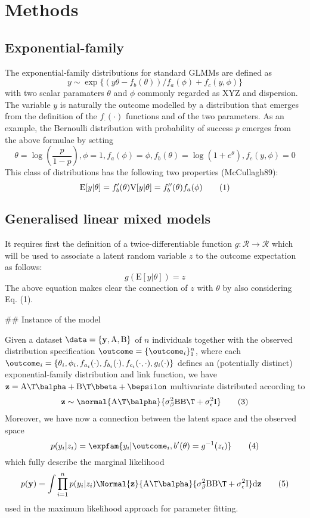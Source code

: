 \section{Methods}

\subsection{Exponential-family}

The exponential-family distributions for standard GLMMs are defined as
$$
y \sim \exp\{(y\theta - f_b(\theta))/f_a(\phi) + f_c(y, \phi)\}
$$
with two scalar paramaters $\theta$ and $\phi$ commonly regarded as XYZ and dispersion. The variable $y$ is naturally the outcome modelled by a distribution that emerges from the definition of the $f_{\cdot}(\cdot)$ functions and of the two parameters. As an example, the Bernoulli distribution with probability of success $p$ emerges from the above formulae by setting
$$
\theta = \log\left(\frac{p}{1-p}\right), \phi = 1, f_a(\phi) = \phi, f_b(\theta)=\log(1+e^\theta), f_c(y, \phi) = 0
$$
This class of distributions has the following two properties (McCullagh89):
$$

\mathrm E[y|\theta] = f'_b(\theta)\\
\mathrm V[y|\theta] = f''_b(\theta) f_a(\phi) \tag{1}

$$

\subsection{Generalised linear mixed models}

It requires first the definition of a twice-differentiable  function $g:\mathcal R \rightarrow \mathcal R$ which will be used to associate a latent random variable $z$ to the outcome expectation as follows:
$$
g(\mathrm E[y|\theta]) = z  \tag{2}
$$
The above equation makes clear the connection of $z$ with $\theta$ by also considering Eq. (1).

## Instance of the model

Given a dataset $\data = \{\mathbf y, \mathrm A, \mathrm B\}$ of $n$ individuals together with the observed distribution specification $\outcome=\{\outcome_i\}_1^n$, where each $\outcome_i = \{\theta_i, \phi_i, f_{a_i}(\cdot), f_{b_i}(\cdot), f_{c_i}(\cdot, \cdot), g_i(\cdot)\}$ defines an (potentially distinct) exponential-family distribution and link function, we have $\mathbf z = \mathrm A\T\balpha + \mathrm B\T\bbeta + \bepsilon$  multivariate distributed according to
$$
\mathbf z \sim \normal{\mathrm A\T \balpha}{\sigma^2_{\beta} \mathrm B\mathrm B\T + \sigma^2_{\epsilon} \mathrm I} \tag{3}
$$
Moreover, we have now a connection between the latent space and the observed space
$$
p(y_i | z_i) = \expfam{y_i | \outcome_i, b'(\theta)=g^{-1}(z_i)} \tag{4}
$$
which fully describe the marginal likelihood
$$
p(\mathbf y) = \int \prod_{i=1}^n p(y_i|z_i) \Normal{\mathbf z}{\mathrm A\T \balpha}{\sigma^2_{\beta} \mathrm B\mathrm B\T + \sigma^2_{\epsilon} \mathrm I} \mathrm d \mathbf z \tag{5}
$$
used in the maximum likelihood approach for parameter fitting.

